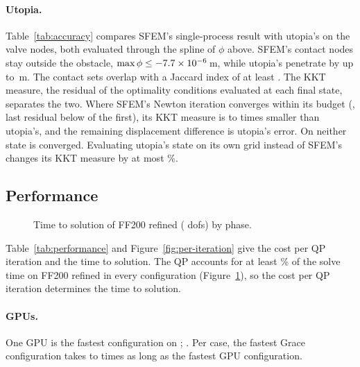 \documentclass[sigconf,nonacm]{acmart}
\begin{document}
\paragraph{Utopia.} Table~\ref{tab:accuracy} compares SFEM's single-process result with utopia's on
the valve nodes, both evaluated through the spline of $\phi$ above. SFEM's contact nodes stay outside the obstacle, $\max\phi \le \num{-7.7e-6}$\,\si{\metre},
while utopia's penetrate by up to \abPenUtopiaMax\,\si{\metre}. The contact sets overlap with a
Jaccard index of at least \abJaccardMin{}. The KKT measure, the residual of the optimality
conditions evaluated at each final state, separates the two. Where SFEM's Newton iteration
converges within its budget (\convergedCases{}, last residual below \convergedTol{} of the
first), its KKT measure is \kktRatioMin{} to \kktRatioMax{} times smaller than utopia's, and the
remaining displacement difference is utopia's error. On \unconvergedCases{} neither state is
converged. Evaluating utopia's state on its own grid instead of SFEM's changes its KKT measure by
at most \kktGridChange\%.

\begin{table}
\caption{SFEM ($S$, single process) against utopia ($U$) on the valve nodes: displacement
difference relative to utopia's displacement, largest signed distance of a contact node (positive
inside the obstacle), KKT measure of the final state, and Jaccard index of the contact sets.}
\label{tab:accuracy}
\small

\end{table}

\subsection{Performance}

\begin{figure}[t]
\centering

\caption{Time to solution of FF200 refined (\dofsFFf{} dofs) by phase.}
\label{fig:breakdown}
\end{figure}

Table~\ref{tab:performance} and Figure~\ref{fig:per-iteration} give the cost per QP iteration and
the time to solution. The QP accounts for at least \qpShareFFf\% of the solve time on FF200 refined
in every configuration (Figure~\ref{fig:breakdown}), so the cost per QP iteration determines the
time to solution.

\paragraph{GPUs.} One GPU is the fastest configuration on \oneGpuBestCases{}; \bestElsewhere{}. Per case, the fastest Grace configuration takes
\gpuOverGraceMin{} to \gpuOverGraceMax{} times as long as the fastest GPU configuration.
\end{document}
